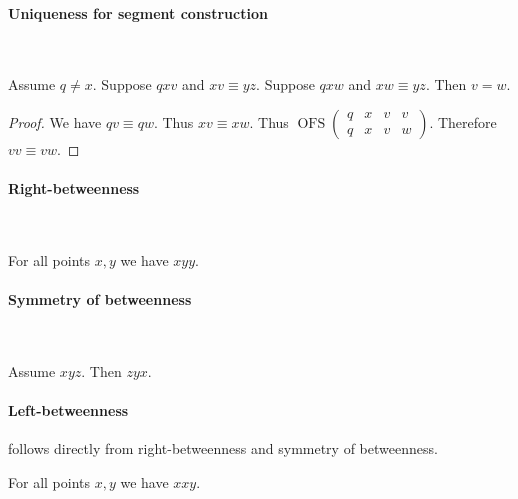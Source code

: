 \documentclass[10pt,a4paper,parskip=half,numbers=endperiod,headings=standardclasses,parskip]{scrbook}
\newcommand{\Cong}[4]{#1 #2 \equiv #3 #4}
\newcommand{\Betw}[3]{#1 #2 #3}
\newcommand{\OFS}[8]{\operatorname{OFS}
\left(\begin{smallmatrix}%
#1 & #2 & #3 & #4 \\
#5 & #6 & #7 & #8
\end{smallmatrix}\right)%
}
\begin{document}
  \paragraph{Uniqueness for segment construction}\

  \begin{forthel}
    \begin{lemma} %
      Assume $q \neq x$.
      Suppose $\Betw{q}{x}{v}$ and $\Cong{x}{v}{y}{z}$.
      Suppose $\Betw{q}{x}{w}$ and $\Cong{x}{w}{y}{z}$.
      Then $v = w$.
    \end{lemma}
    \begin{proof}
      We have $\Cong{q}{v}{q}{w}$.
      Thus $\Cong{x}{v}{x}{w}$.
      Thus $\OFS{q}{x}{v}{v}{q}{x}{v}{w}$.
      Therefore $\Cong{v}{v}{v}{w}$.
    \end{proof}
  \end{forthel}


  \paragraph{Right-betweenness}\

  \begin{forthel}
    \begin{lemma} %
      For all points $x, y$ we have $\Betw{x}{y}{y}$.
    \end{lemma}
  \end{forthel}

  \paragraph{Symmetry of betweenness}\

  \begin{forthel}
    \begin{lemma} %
      Assume $\Betw{x}{y}{z}$. Then $\Betw{z}{y}{x}$.
    \end{lemma}
  \end{forthel}

  \paragraph{Left-betweenness} follows directly
  from right-betweenness and symmetry of betweenness.
  \begin{forthel}
    \begin{lemma} %
      For all points $x, y$ we have  $\Betw{x}{x}{y}$.
    \end{lemma}
  \end{forthel}
\end{document}
